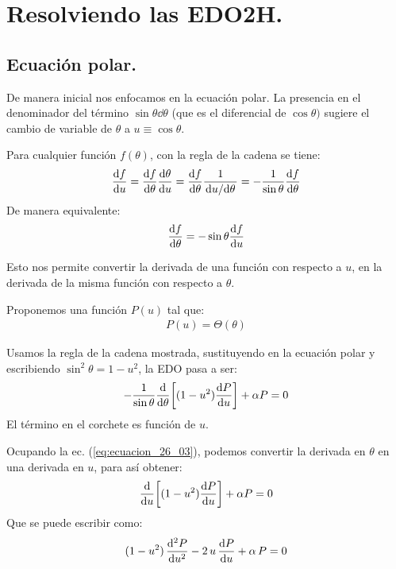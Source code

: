\section{Resolviendo las EDO2H.}

\subsection{Ecuación polar.}

De manera inicial nos enfocamos en la ecuación polar. La presencia en el denominador del término $\sin \theta \dd{\theta}$ (que es el diferencial de $\cos \theta)$ sugiere el cambio de variable de $\theta$ a $u \equiv \cos \theta$.
\par
Para cualquier función $f(\theta)$, con la regla de la cadena se tiene:
\begin{align*}
\dv{f}{u} =  \dv{f}{\theta} \dv{\theta}{u} =  \dv{f}{\theta} \dfrac{1}{\dv*{u}{\theta}} =  - \dfrac{1}{\sin \theta} \dv{f}{\theta}
\end{align*}
De manera equivalente:
\begin{align}
\dv{f}{\theta} = - \sin \theta \dv{f}{u}
\label{eq:ecuacion_26_03}
\end{align}

Esto nos permite convertir la derivada de una función con respecto a $u$, en la derivada de la misma función con respecto a $\theta$.
\par
Proponemos una función $P(u)$ tal que:
\begin{align*}
P(u) = \Theta(\theta)
\end{align*}

Usamos la regla de la cadena mostrada, sustituyendo en la ecuación polar y escribiendo $\sin^{2} \theta = 1 - u^{2}$, la EDO pasa a ser:
\begin{align*}
- \dfrac{1}{\sin \theta} \dv{\theta} \bigg[ (1 - u^{2}) \dv{P}{u} \bigg] + \alpha P = 0
\end{align*}
El término en el corchete es función de $u$.
\par
Ocupando la ec. (\ref{eq:ecuacion_26_03}), podemos convertir la derivada en $\theta$ en una derivada en $u$, para así obtener:
\begin{align}
\dv{u} \bigg[ (1 - u^{2}) \dv{P}{u} \bigg] + \alpha P = 0
\label{eq:ecuacion_26_04}
\end{align}
Que se puede escribir como:
\begin{align}
(1 - u^{2}) \, \dv[2]{P}{u} - 2 \, u \, \dv{P}{u} + \alpha \, P = 0
\label{eq:ecuacion_26_05}
\end{align}

